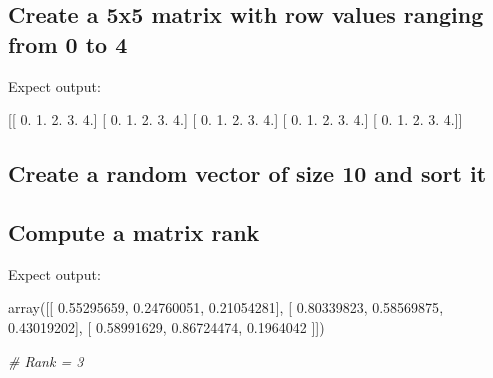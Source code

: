 \documentclass[11pt]{article}
\newenvironment{Shaded}{}{}
\newcommand{\DecValTok}[1]{\textcolor[rgb]{0.25,0.63,0.44}{{#1}}}
\newcommand{\FloatTok}[1]{\textcolor[rgb]{0.25,0.63,0.44}{{#1}}}
\newcommand{\CommentTok}[1]{\textcolor[rgb]{0.38,0.63,0.69}{\textit{{#1}}}}
\newcommand{\NormalTok}[1]{{#1}}
\begin{document}
    \subsection{Create a 5x5 matrix with row values ranging from 0 to
4}\label{create-a-5x5-matrix-with-row-values-ranging-from-0-to-4}

Expect output:

\begin{Shaded}
\begin{Highlighting}[]
\NormalTok{[[ }\DecValTok{0}\NormalTok{.  }\DecValTok{1}\NormalTok{.  }\DecValTok{2}\NormalTok{.  }\DecValTok{3}\NormalTok{.  }\DecValTok{4}\NormalTok{.]}
\NormalTok{ [ }\DecValTok{0}\NormalTok{.  }\DecValTok{1}\NormalTok{.  }\DecValTok{2}\NormalTok{.  }\DecValTok{3}\NormalTok{.  }\DecValTok{4}\NormalTok{.]}
\NormalTok{ [ }\DecValTok{0}\NormalTok{.  }\DecValTok{1}\NormalTok{.  }\DecValTok{2}\NormalTok{.  }\DecValTok{3}\NormalTok{.  }\DecValTok{4}\NormalTok{.]}
\NormalTok{ [ }\DecValTok{0}\NormalTok{.  }\DecValTok{1}\NormalTok{.  }\DecValTok{2}\NormalTok{.  }\DecValTok{3}\NormalTok{.  }\DecValTok{4}\NormalTok{.]}
\NormalTok{ [ }\DecValTok{0}\NormalTok{.  }\DecValTok{1}\NormalTok{.  }\DecValTok{2}\NormalTok{.  }\DecValTok{3}\NormalTok{.  }\DecValTok{4}\NormalTok{.]]}
\end{Highlighting}
\end{Shaded}

    \subsection{Create a random vector of size 10 and sort
it}\label{create-a-random-vector-of-size-10-and-sort-it}

    \subsection{Compute a matrix rank}\label{compute-a-matrix-rank}

Expect output:

\begin{Shaded}
\begin{Highlighting}[]
\NormalTok{array([[ }\FloatTok{0.55295659}\NormalTok{,  }\FloatTok{0.24760051}\NormalTok{,  }\FloatTok{0.21054281}\NormalTok{],}
\NormalTok{       [ }\FloatTok{0.80339823}\NormalTok{,  }\FloatTok{0.58569875}\NormalTok{,  }\FloatTok{0.43019202}\NormalTok{],}
\NormalTok{       [ }\FloatTok{0.58991629}\NormalTok{,  }\FloatTok{0.86724474}\NormalTok{,  }\FloatTok{0.1964042}\NormalTok{ ]])}
       
\CommentTok{# Rank = 3}
\end{Highlighting}
\end{Shaded}
\end{document}
